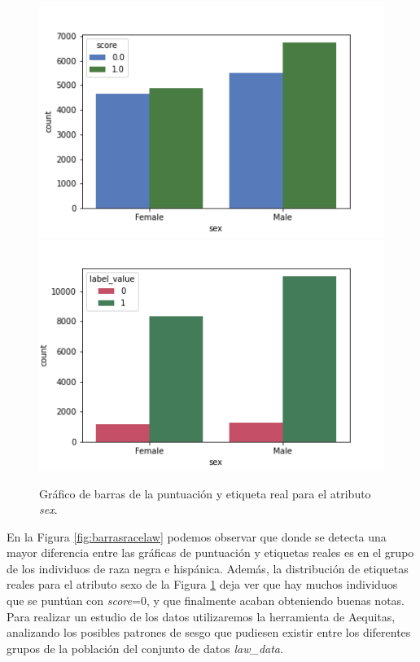 \begin{figure}[h]
      \includegraphics[width=\linewidth]{images/score_sex_law.png}
    \endminipage\hfill
      \includegraphics[width=\linewidth]{images/label_sex_law.png}
    \endminipage
     \caption{Gráfico de barras de la puntuación y etiqueta real para el atributo \textit{sex}.}
     \label{fig:barrassexlaw}
\end{figure}

En la Figura \ref{fig:barrasracelaw} podemos observar que donde se detecta una mayor diferencia entre las gráficas de puntuación y etiquetas reales es en el grupo de los individuos de raza negra e hispánica. Además, la distribución de etiquetas reales para el atributo sexo de la Figura \ref{fig:barrassexlaw} deja ver que hay muchos individuos que se puntúan con \textit{score}=0, y que finalmente acaban obteniendo buenas notas. Para realizar un estudio de los datos utilizaremos la herramienta de Aequitas, analizando los posibles patrones de sesgo que pudiesen existir entre los diferentes grupos de la población del conjunto de datos \textit{law\_data}.

